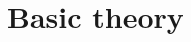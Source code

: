 \documentclass[12pt,a4paper]{report}
\theoremstyle{definition}
\begin{document}





\chapter{Basic theory} \label{chapter}
\end{document}
